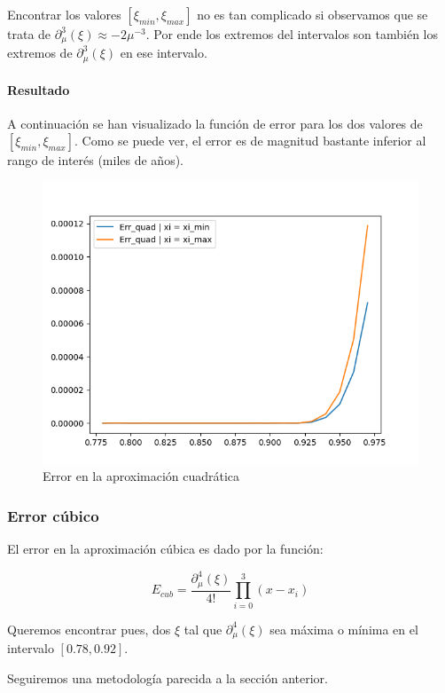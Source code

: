 Encontrar los valores $[\xi_{min}, \xi_{max}]$ no es tan complicado si observamos que se trata de $\partial_{\mu}^3(\xi) \approx -2\mu^{-3} $. Por ende los extremos del intervalos son también los extremos de $\partial_{\mu}^3(\xi)$ en ese intervalo.

\paragraph{Resultado}


A continuación se han visualizado la función de error para los dos valores de $[\xi_{min}, \xi_{max}]$. Como se puede ver, el error es de magnitud bastante inferior al rango de interés (miles de años).


\begin{figure}[H]
	\includegraphics[width=\linewidth]{figures/figure6.png}
	\caption{Error en la aproximación cuadrática}
	\label{fig:err_cuad}
\end{figure}


\subsubsection{Error cúbico}

El error en la aproximación cúbica es dado por la función:

$$ E_{cub} = \frac{ \partial_{\mu}^4(\xi) }{4!} \prod_{i=0}^{3} (x - x_i) $$

Queremos encontrar pues, dos $\xi$ tal que $\partial_{\mu}^4(\xi)$ sea máxima o mínima en el intervalo $[0.78, 0.92]$.

Seguiremos una metodología parecida a la sección anterior.

